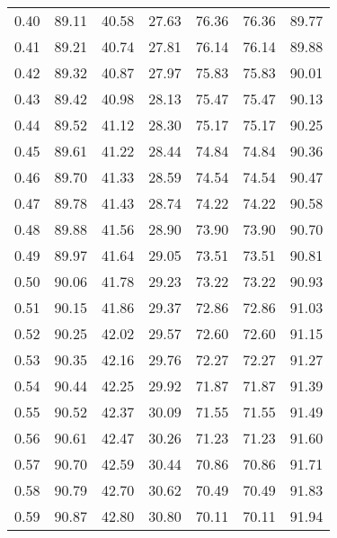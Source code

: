 \begin{tabular}{|c|c|c|c|c|c|c|}
      0.40 &     89.11 &     40.58 &      27.63 &   76.36 &      76.36 &         89.77 \\
      0.41 &     89.21 &     40.74 &      27.81 &   76.14 &      76.14 &         89.88 \\
      0.42 &     89.32 &     40.87 &      27.97 &   75.83 &      75.83 &         90.01 \\
      0.43 &     89.42 &     40.98 &      28.13 &   75.47 &      75.47 &         90.13 \\
      0.44 &     89.52 &     41.12 &      28.30 &   75.17 &      75.17 &         90.25 \\
      0.45 &     89.61 &     41.22 &      28.44 &   74.84 &      74.84 &         90.36 \\
      0.46 &     89.70 &     41.33 &      28.59 &   74.54 &      74.54 &         90.47 \\
      0.47 &     89.78 &     41.43 &      28.74 &   74.22 &      74.22 &         90.58 \\
      0.48 &     89.88 &     41.56 &      28.90 &   73.90 &      73.90 &         90.70 \\
      0.49 &     89.97 &     41.64 &      29.05 &   73.51 &      73.51 &         90.81 \\
      0.50 &     90.06 &     41.78 &      29.23 &   73.22 &      73.22 &         90.93 \\
      0.51 &     90.15 &     41.86 &      29.37 &   72.86 &      72.86 &         91.03 \\
      0.52 &     90.25 &     42.02 &      29.57 &   72.60 &      72.60 &         91.15 \\
      0.53 &     90.35 &     42.16 &      29.76 &   72.27 &      72.27 &         91.27 \\
      0.54 &     90.44 &     42.25 &      29.92 &   71.87 &      71.87 &         91.39 \\
      0.55 &     90.52 &     42.37 &      30.09 &   71.55 &      71.55 &         91.49 \\
      0.56 &     90.61 &     42.47 &      30.26 &   71.23 &      71.23 &         91.60 \\
      0.57 &     90.70 &     42.59 &      30.44 &   70.86 &      70.86 &         91.71 \\
      0.58 &     90.79 &     42.70 &      30.62 &   70.49 &      70.49 &         91.83 \\
      0.59 &     90.87 &     42.80 &      30.80 &   70.11 &      70.11 &         91.94 \\

\end{tabular}
